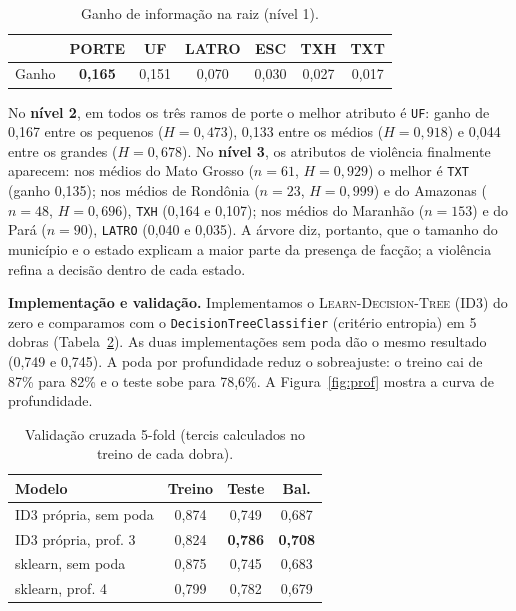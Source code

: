 \documentclass[10pt,a4paper,twocolumn]{article}
\begin{document}
\begin{table}[H]\centering\footnotesize\setlength\tabcolsep{3.5pt}
\begin{tabular}{lcccccc}\toprule
& PORTE & UF & LATRO & ESC & TXH & TXT\\\midrule
Ganho & \textbf{0,165} & 0,151 & 0,070 & 0,030 & 0,027 & 0,017\\\bottomrule
\end{tabular}\caption{Ganho de informação na raiz (nível 1).}\label{tab:ganho}\end{table}

No \textbf{nível 2}, em todos os três ramos de porte o melhor atributo é \texttt{UF}: ganho de 0,167
entre os pequenos ($H=0{,}473$), 0,133 entre os médios ($H=0{,}918$) e 0,044 entre os grandes
($H=0{,}678$). No \textbf{nível 3}, os atributos de violência finalmente aparecem: nos médios do
Mato Grosso ($n=61$, $H=0{,}929$) o melhor é \texttt{TXT} (ganho 0,135); nos médios de Rondônia
($n=23$, $H=0{,}999$) e do Amazonas ($n=48$, $H=0{,}696$), \texttt{TXH} (0,164 e 0,107); nos médios
do Maranhão ($n=153$) e do Pará ($n=90$), \texttt{LATRO} (0,040 e 0,035). A árvore diz, portanto,
que o tamanho do município e o estado explicam a maior parte da presença de facção; a violência
refina a decisão dentro de cada estado.

\textbf{Implementação e validação.} Implementamos o \textsc{Learn-Decision-Tree} (ID3) do zero e
comparamos com o \texttt{DecisionTreeClassifier} (critério entropia) em 5 dobras
(Tabela~\ref{tab:arvore}). As duas implementações sem poda dão o mesmo resultado (0,749 e 0,745).
A poda por profundidade reduz o sobreajuste: o treino cai de 87\% para 82\% e o teste sobe para
78,6\%. A Figura~\ref{fig:prof} mostra a curva de profundidade.

\begin{table}[H]\centering\small
\begin{tabular}{lccc}\toprule
Modelo & Treino & Teste & Bal.\\\midrule
ID3 própria, sem poda & 0,874 & 0,749 & 0,687\\
ID3 própria, prof. 3 & 0,824 & \textbf{0,786} & \textbf{0,708}\\
sklearn, sem poda & 0,875 & 0,745 & 0,683\\
sklearn, prof. 4 & 0,799 & 0,782 & 0,679\\\bottomrule
\end{tabular}\caption{Validação cruzada 5-fold (tercis calculados no treino de cada dobra).}\label{tab:arvore}\end{table}
\end{document}
